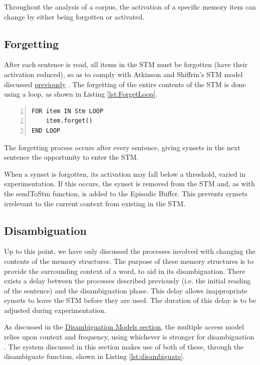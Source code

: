 \documentclass[]{article}
\begin{document}
Throughout the analysis of a corpus, the activation of a specific memory item can change by either being forgotten or activated.

\subsection{Forgetting}
\label{sec:forgetting}
After each sentence is read, all items in the STM must be forgotten (have their activation reduced), so as to comply with Atkinson and Shiffrin's STM model discussed \hyperref[ShortTerm]{previously} \cite{ControlProcessesSTMAtkinson}. The forgetting of the entire contents of the STM is done using a loop, as shown in Listing \ref{lst:ForgetLoop}.

\begin{lstlisting}[numbers=left, numberstyle=\small, caption={Forget loop}, captionpos=b, label={lst:ForgetLoop}]
FOR item IN Stm LOOP
	item.forget()
END LOOP
\end{lstlisting}

The forgetting process occurs after every sentence, giving synsets in the next sentence the opportunity to enter the STM.

When a synset is forgotten, its activation may fall below a threshold, varied in experimentation. If this occurs, the synset is removed from the STM and, as with the sendToStm function, is added to the Episodic Buffer. This prevents synsets irrelevant to the current context from existing in the STM.

\subsection{Disambiguation}
\label{sec:ImplementedDisambiguation}
Up to this point, we have only discussed the processes involved with changing the contents of the memory structures. The purpose of these memory structures is to provide the surrounding context of a word, to aid in its disambiguation. There exists a delay between the processes described previously (i.e. the initial reading of the sentence) and the disambiguation phase. This delay allows inappropriate synsets to leave the STM before they are used. The duration of this delay is to be adjusted during experimentation.

As discussed in the \hyperref[sec:DisambiguationModels]{Disambiguation Models section}, the multiple access model relies upon context and frequency, using whichever is stronger for disambiguation \cite{PsychologyOfLanguage}. The system discussed in this section makes use of both of these, through the disambiguate function, shown in Listing \ref{lst:disambiguate}.
\end{document}

